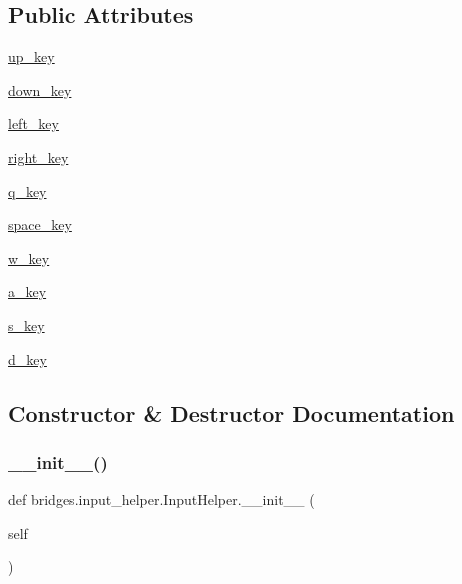 \subsection*{Public Attributes}
\begin{DoxyCompactItemize}
\item 
\mbox{\hyperlink{classbridges_1_1input__helper_1_1_input_helper_ab73e09b11d389d7dd63f0772eba7f39e}{up\+\_\+key}}
\item 
\mbox{\hyperlink{classbridges_1_1input__helper_1_1_input_helper_aa04e96346543b8cdf8352440b021ba53}{down\+\_\+key}}
\item 
\mbox{\hyperlink{classbridges_1_1input__helper_1_1_input_helper_a15b6199dc0dfd7354557a19e07755f5a}{left\+\_\+key}}
\item 
\mbox{\hyperlink{classbridges_1_1input__helper_1_1_input_helper_a1d34896a89ac06f8ab93915e668f4f75}{right\+\_\+key}}
\item 
\mbox{\hyperlink{classbridges_1_1input__helper_1_1_input_helper_ad50670b8a6479a116dd9f1468e2b6a66}{q\+\_\+key}}
\item 
\mbox{\hyperlink{classbridges_1_1input__helper_1_1_input_helper_a7500af436b4d85fc13fb351d661cf0d9}{space\+\_\+key}}
\item 
\mbox{\hyperlink{classbridges_1_1input__helper_1_1_input_helper_a5805e22dfd0bda43e27aacb3bc638df3}{w\+\_\+key}}
\item 
\mbox{\hyperlink{classbridges_1_1input__helper_1_1_input_helper_acb7d988d14de58f5fff87ad91bef430f}{a\+\_\+key}}
\item 
\mbox{\hyperlink{classbridges_1_1input__helper_1_1_input_helper_a88978da995aaea7c6267a72cbd4d11c9}{s\+\_\+key}}
\item 
\mbox{\hyperlink{classbridges_1_1input__helper_1_1_input_helper_a04f38a8c929984bdc0c6f4c98927c8dd}{d\+\_\+key}}
\end{DoxyCompactItemize}


\subsection{Constructor \& Destructor Documentation}
\mbox{\label{classbridges_1_1input__helper_1_1_input_helper_a1e5078f3c252de554409d3fdb49fcaaa}} 
\subsubsection{\texorpdfstring{\_\_init\_\_()}{\_\_init\_\_()}}
{\footnotesize\ttfamily def bridges.\+input\+\_\+helper.\+Input\+Helper.\+\_\+\+\_\+init\+\_\+\+\_\+ (\begin{DoxyParamCaption}\item[{}]{self }\end{DoxyParamCaption})}



